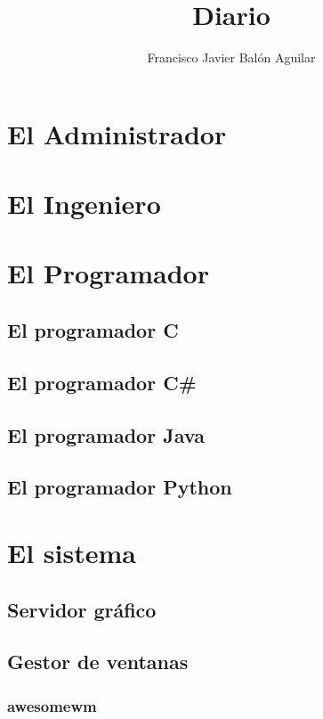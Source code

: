 \documentclass[a4paper, 11pt, titlepage]{book}
\title{Diario}
\author{Francisco Javier Balón Aguilar}
\begin{document}
\maketitle
\renewcommand{\contentsname}{Índice}
\tableofcontents
\newpage

\chapter{El Administrador}

\chapter{El Ingeniero}

\chapter{El Programador}

    \section{El programador C}

    \section{El programador C\#}

    \section{El programador Java}

    \section{El programador Python}

\chapter{El sistema}

    \section{Servidor gráfico}

    \section{Gestor de ventanas}

        \subsection{awesomewm}
\end{document}
